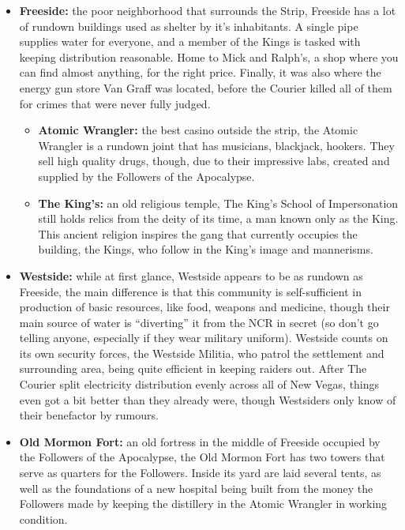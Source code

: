 \begin{itemize}
\item \textbf{Freeside:} the poor neighborhood that surrounds the Strip, Freeside has a lot of rundown buildings used as shelter by it's inhabitants. A single pipe supplies water for everyone, and a member of the Kings is tasked with keeping distribution reasonable. Home to Mick and Ralph's, a shop where you can find almost anything, for the right price. Finally, it was also where the energy gun store Van Graff was located, before the Courier killed all of them for crimes that were never fully judged.
	\begin{itemize}
	\item \textbf{Atomic Wrangler:} the best casino outside the strip, the Atomic Wrangler is a rundown joint that has musicians, blackjack, hookers. They sell high quality drugs, though, due to their impressive labs, created and supplied by the Followers of the Apocalypse.
	\item \textbf{The King's:} an old religious temple, The King's School of Impersonation still holds relics from the deity of its time, a man known only as the King. This ancient religion inspires the gang that currently occupies the building, the Kings, who follow in the King's image and mannerisms.
	\end{itemize}

\item \textbf{Westside:} while at first glance, Westside appears to be as rundown as Freeside, the main difference is that this community is self-sufficient in production of basic resources, like food, weapons and medicine, though their main source of water is ``diverting'' it from the NCR in secret (so don't go telling anyone, especially if they wear military uniform). Westside counts on its own security forces, the Westside Militia, who patrol the settlement and surrounding area, being quite efficient in keeping raiders out. After The Courier split electricity distribution evenly across all of New Vegas, things even got a bit better than they already were, though Westsiders only know of their benefactor by rumours.

\item \textbf{Old Mormon Fort:} an old fortress in the middle of Freeside occupied by the Followers of the Apocalypse, the Old Mormon Fort has two towers that serve as quarters for the Followers. Inside its yard are laid several tents, as well as the foundations of a new hospital being built from the money the Followers made by keeping the distillery in the Atomic Wrangler in working condition.


\end{itemize}
